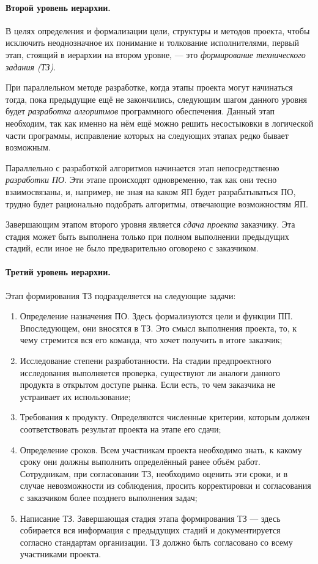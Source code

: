 \paragraph{Второй уровень иерархии.}

В целях определения и формализации цели, структуры и методов проекта, чтобы исключить неоднозначное их понимание и толкование исполнителями, первый этап, стоящий в иерархии на втором уровне, --- это \textit{формирование технического задания (ТЗ)}.

При параллельном методе разработке, когда этапы проекта могут начинаться тогда, пока предыдущие ещё не закончились, следующим шагом данного уровня будет \textit{разработка алгоритмов} программного обеспечения. Данный этап необходим, так как именно на нём ещё можно решить несостыковки в логической части программы, исправление которых на следующих этапах редко бывает возможным.

Параллельно с разработкой алгоритмов начинается этап непосредственно \textit{разработки ПО}. Эти этапе происходят одновременно, так как они тесно взаимосвязаны, и, например, не зная на каком ЯП будет разрабатываться ПО, трудно будет рационально подобрать алгоритмы, отвечающие возможностям ЯП.

Завершающим этапом второго уровня является \textit{сдача проекта} заказчику. Эта стадия может быть выполнена только при полном выполнении предыдущих стадий, если иное не было предварительно оговорено с заказчиком.

\paragraph{Третий уровень иерархии.}

Этап формирования ТЗ подразделяется на следующие задачи:

\begin{enumerate}
	\item Определение назначения ПО. Здесь формализуются цели и функции ПП. Впоследующем, они вносятся в ТЗ. Это смысл выполнения проекта, то, к чему стремится вся его команда, что хочет получить в итоге заказчик;
	\item Исследование степени разработанности. На стадии предпроектного исследования выполняется проверка, существуют ли аналоги данного продукта в открытом доступе рынка. Если есть, то чем заказчика не устраивает их использование;
	\item Требования к продукту. Определяются численные критерии, которым должен соответствовать результат проекта на этапе его сдачи;
	\item Определение сроков. Всем участникам проекта необходимо знать, к какому сроку они должны выполнить определённый ранее объём работ. Сотрудникам, при согласовании ТЗ, необходимо оценить эти сроки, и в случае невозможности из соблюдения, просить корректировки и согласования с заказчиком более позднего выполнения задач;
	\item Написание ТЗ. Завершающая стадия этапа формирования ТЗ --- здесь собирается вся информация с предыдущих стадий и документируется согласно стандартам организации. ТЗ должно быть согласовано со всему участниками проекта.
\end{enumerate}

